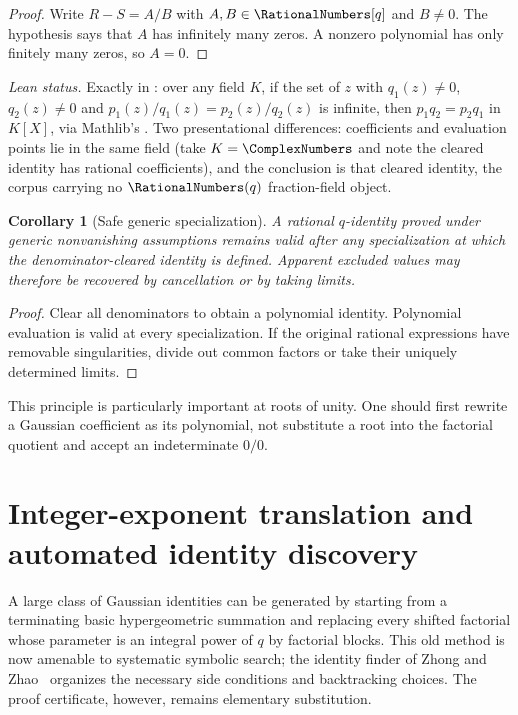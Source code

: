 \documentclass[11pt,a4paper,oneside,openany]{book}
\newtheorem{corollary}[corollary]{Corollary}
\theoremstyle{definition}
\theoremstyle{remark}
\begin{document}
\begin{proof}
Write $R-S=A/B$ with $A,B\in\RationalNumbers[q]$ and $B\ne0$.  The hypothesis says that $A$ has infinitely many zeros.  A nonzero polynomial has only finitely many zeros, so $A=0$.
\end{proof}
\emph{Lean status.}  Exactly  in
: over any field \(K\), if the set of \(z\) with \(q_1(z)\ne0\),
\(q_2(z)\ne0\) and \(p_1(z)/q_1(z)=p_2(z)/q_2(z)\) is infinite, then \(p_1q_2=p_2q_1\) in \(K[X]\), via
Mathlib's .  Two presentational differences: coefficients and
evaluation points lie in the same field (take \(K=\ComplexNumbers\) and note the cleared identity has
rational coefficients), and the conclusion is that cleared identity, the corpus carrying no
\(\RationalNumbers(q)\) fraction-field object.


\begin{corollary}[Safe generic specialization]\label{cor:safe-specialization}
A rational $q$-identity proved under generic nonvanishing assumptions remains valid after any specialization at which the denominator-cleared identity is defined.  Apparent excluded values may therefore be recovered by cancellation or by taking limits.
\end{corollary}

\begin{proof}
Clear all denominators to obtain a polynomial identity.  Polynomial evaluation is valid at every specialization.  If the original rational expressions have removable singularities, divide out common factors or take their uniquely determined limits.
\end{proof}

This principle is particularly important at roots of unity.  One should first rewrite a Gaussian coefficient as its polynomial, not substitute a root into the factorial quotient and accept an indeterminate $0/0$.

\section{Integer-exponent translation and automated identity discovery}\label{sec:identity-discovery}

A large class of Gaussian identities can be generated by starting from a terminating basic hypergeometric summation and replacing every shifted factorial whose parameter is an integral power of $q$ by factorial blocks.  This old method is now amenable to systematic symbolic search; the identity finder of Zhong and Zhao~\cite{ZhongZhao2026} organizes the necessary side conditions and backtracking choices.  The proof certificate, however, remains elementary substitution.
\end{document}
